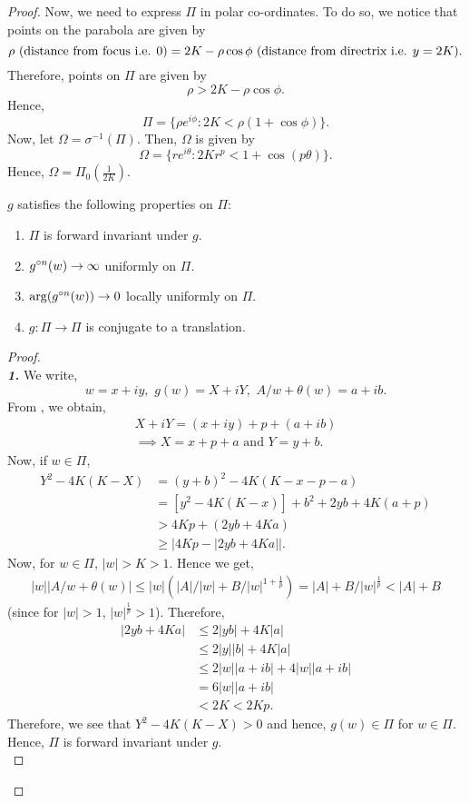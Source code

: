 \begin{proof}
	Now, we need to express \( \Pi  \) in polar co-ordinates. To do so, we notice that points on the parabola are given by \[
		\rho \text{ (distance from focus i.e. \( 0 \))}= 2K-\rho \cos \phi \text{ (distance from directrix i.e. \( y=2K \))}
	.\] 
	Therefore, points on \( \Pi \) are given by \[
		\rho > 2K-\rho \cos \phi 
	.\] 
	Hence, \[
		\Pi=\{\rho e^{i\phi }:2K<\rho (1+\cos \phi )\}
	.\] Now, let \( \Omega=\sigma^{-1}(\Pi) \).
	Then, \( \Omega \) is given by \[
		\Omega=\{re^{i \theta }:2Kr^p<1+\cos (p\theta )\}
.\] Hence, \( \Omega=\Pi_0\left(\frac{1}{2K}\right) \).

\begin{lemma}
	\( g \) satisfies the following properties on \( \Pi \):
	\begin{enumerate}
		\item \(\Pi\) is forward invariant under \( g \).
		\item \( \gog[n](w)\to \infty \) uniformly on \( \Pi \).
		\item \( \arg(\gog[n](w))\to 0 \) locally uniformly on \( \Pi \).
		\item \( g:\Pi\to \Pi \) is conjugate to a translation.
	\end{enumerate}
\end{lemma}
\begin{proof}\text{}\\
	\noindent \textbf{\emph{1.}} We write, \[
		w=x+iy,\,\, g(w)=X+iY,\,\, A /w+\theta(w)=a+ib
	.\] 
	From , we obtain,
	\begin{align*}
		X+iY=(x+iy)+p+(a+ib)\\
	\implies X=x+p+a\text{ and }Y=y+b
	.\end{align*}
	Now, if \( w\in \Pi  \),
	\begin{align*}
		Y^2-4K(K-X)&=(y+b)^2-4K(K-x-p-a)\\
				   &=[y^2-4K(K-x)]+b^2+2yb+4K(a+p)\\
				   &> 4Kp+(2yb+4Ka)\\
				   &\ge |4Kp- |2yb+4Ka| |
	.\end{align*}
	Now, for \( w\in\Pi \), \( |w|>K>1 \). Hence we get,
	\begin{align}
		|w||A /w+\theta (w)|\le |w| (|A| /|w|+ B /|w|^{1+\frac{1}{p}})=|A|+B /|w|^{\frac{1}{p}}<|A|+B \label{eqn3.3}
	\end{align}
	(since for \( |w|>1 \), \( |w|^{\frac{1}{p}}>1 \)).  Therefore,
	\begin{align*}
		|2yb+4Ka|&\le 2|yb|	+4K|a|\\
				 &\le 2|y| |b|+4 K |a| \\
				 &\le 2|w| |a+ib| +4 |w| |a+ib| \\
				 &=6|w| |a+ib|\\
				 &<2K<2Kp
	.\end{align*}
	Therefore, we see that \( Y^2-4K(K-X)>0 \) and hence, \( g(w)\in \Pi \) for \( w\in \Pi \).
	Hence, \( \Pi \) is forward invariant under \( g \).\\
	\vspace{1pt}


\end{proof}
\end{proof}
